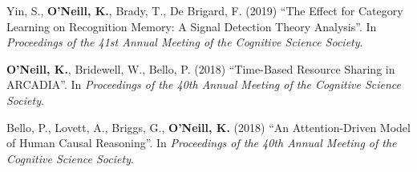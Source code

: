 Yin, S., \textbf{O'Neill, K.}, Brady, T., De Brigard, F. (2019) ``The
Effect for Category Learning on Recognition Memory: A Signal Detection
Theory Analysis''. In \emph{Proceedings of the 41st Annual Meeting of
  the Cognitive Science Society}.

\textbf{O'Neill, K.}, Bridewell, W., Bello, P. (2018) ``Time-Based
Resource Sharing in ARCADIA''. In \emph{Proceedings of the 40th Annual
  Meeting of the Cognitive Science Society}.

Bello, P., Lovett, A., Briggs, G., \textbf{O'Neill, K.} (2018) ``An
Attention-Driven Model of Human Causal Reasoning''. In
\emph{Proceedings of the 40th Annual Meeting of the Cognitive Science
  Society}.
